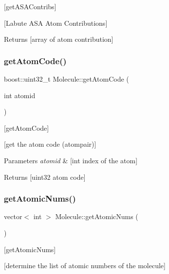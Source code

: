 \mbox{[}get\+A\+S\+A\+Contribs\mbox{]} 

\mbox{[}Labute A\+SA Atom Contributions\mbox{]} \begin{DoxyReturn}{Returns}
\mbox{[}array of atom contribution\mbox{]} 
\end{DoxyReturn}
\mbox{\label{class_molecule_a4123cb22770fc42287562a16affa5ba5}} 
\subsubsection{\texorpdfstring{get\+Atom\+Code()}{getAtomCode()}}
{\footnotesize\ttfamily boost\+::uint32\+\_\+t Molecule\+::get\+Atom\+Code (\begin{DoxyParamCaption}\item[{int}]{atomid }\end{DoxyParamCaption})}



\mbox{[}get\+Atom\+Code\mbox{]} 

\mbox{[}get the atom code (atompair)\mbox{]}


\begin{DoxyParams}{Parameters}
{\em atomid} & \mbox{[}int index of the atom\mbox{]} \\
\hline
\end{DoxyParams}
\begin{DoxyReturn}{Returns}
\mbox{[}uint32 atom code\mbox{]} 
\end{DoxyReturn}
\mbox{\label{class_molecule_ac4010a4be90b8f109903d41a05d3ff81}} 
\subsubsection{\texorpdfstring{get\+Atomic\+Nums()}{getAtomicNums()}}
{\footnotesize\ttfamily vector$<$ int $>$ Molecule\+::get\+Atomic\+Nums (\begin{DoxyParamCaption}{ }\end{DoxyParamCaption})}



\mbox{[}get\+Atomic\+Nums\mbox{]} 

\mbox{[}determine the list of atomic numbers of the molecule\mbox{]}

